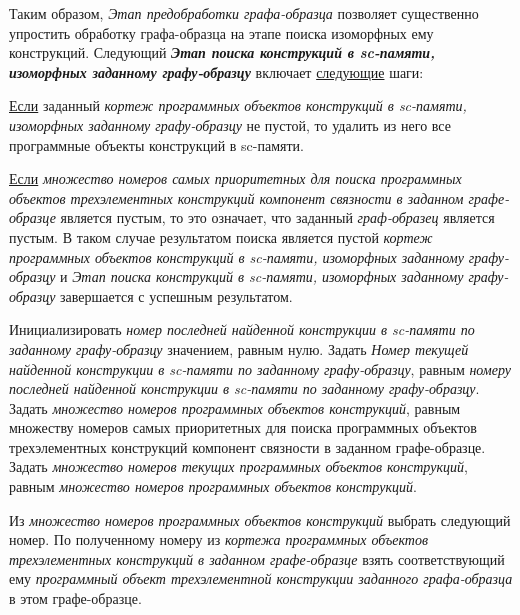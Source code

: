 \begin{SCn}
\begin{scnsubstruct}
\begin{scnsubstruct}
\begin{scnsubstruct}
\begin{scnsubstruct}
\begin{scnsubstruct}
\begin{scnsubstruct}
\begin{scnsubstruct}
\begin{scnsubstruct}
{			Таким образом, \textit{Этап предобработки графа-образца} позволяет существенно упростить обработку графа-образца на этапе поиска изоморфных ему конструкций. Следующий \textbf{\textit{Этап поиска конструкций в sc-памяти, изоморфных заданному графу-образцу}} включает \uline{следующие} шаги:
			\begin{scnitemize}
				\item \uline{Если} заданный \textit{кортеж программных объектов конструкций в sc-памяти, изоморфных заданному графу-образцу} не пустой, то удалить из него все программные объекты конструкций в sc-памяти.
				\item \uline{Если} \textit{множество номеров самых приоритетных для поиска программных объектов трехэлементных конструкций компонент связности в заданном графе-образце} является пустым, то это означает, что заданный \textit{граф-образец} является пустым. В таком случае результатом поиска является пустой \textit{кортеж программных объектов конструкций в sc-памяти, изоморфных заданному графу-образцу} и \textit{Этап поиска конструкций в sc-памяти, изоморфных заданному графу-образцу} завершается с успешным результатом.
				\item Инициализировать \textit{номер последней найденной конструкции в sc-памяти по заданному графу-образцу} значением, равным нулю. Задать \textit{Номер текущей найденной конструкции в sc-памяти по заданному графу-образцу}, равным \textit{номеру последней найденной конструкции в sc-памяти по заданному графу-образцу}. Задать \textit{множество номеров  программных объектов конструкций}, равным {множеству номеров самых приоритетных для поиска программных объектов трехэлементных конструкций компонент связности в заданном графе-образце}. Задать \textit{множество номеров текущих программных объектов конструкций}, равным \textit{множество номеров  программных объектов конструкций}.
				\item Из \textit{множество номеров  программных объектов конструкций} выбрать следующий номер. По полученному номеру из \textit{кортежа программных объектов трехэлементных конструкций в заданном графе-образце} взять соответствующий ему \textit{программный объект трехэлементной конструкции заданного графа-образца} в этом графе-образце.

\end{scnitemize}}
\end{scnsubstruct}
\end{scnsubstruct}
\end{scnsubstruct}
\end{scnsubstruct}
\end{scnsubstruct}
\end{scnsubstruct}
\end{scnsubstruct}
\end{scnsubstruct}
\end{SCn}
